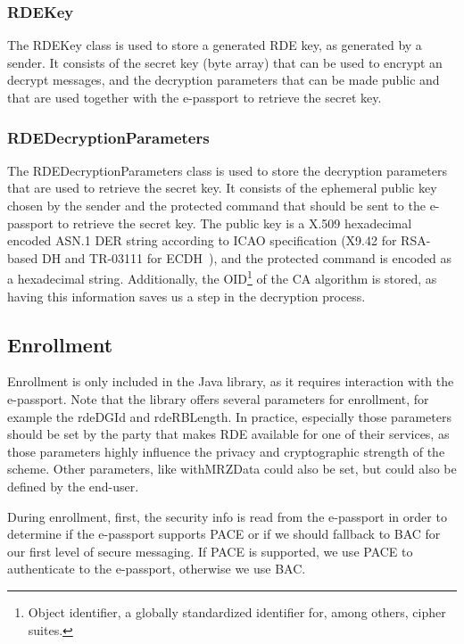 \subsubsection{\textsf{RDEKey}}\label{subsubsec:rdekey}
The \textsf{RDEKey} class is used to store a generated RDE key, as generated by a sender.
It consists of the secret key (byte array) that can be used to encrypt an decrypt messages, and the decryption parameters that can be made public and that are used together with the e-passport to retrieve the secret key.

\subsubsection{\textsf{RDEDecryptionParameters}}\label{subsubsec:rde-decryption-parameters}
The \textsf{RDEDecryptionParameters} class is used to store the decryption parameters that are used to retrieve the secret key.
It consists of the ephemeral public key chosen by the sender and the protected command that should be sent to the e-passport to retrieve the secret key.
The public key is a X.509 hexadecimal encoded ASN.1 DER string according to ICAO specification (X9.42 for RSA-based DH and TR-03111 for ECDH~\cite{icao9303securitymechanisms}), and the protected command is encoded as a hexadecimal string.
Additionally, the OID\footnote{Object identifier, a globally standardized identifier for, among others, cipher suites.} of the CA algorithm is stored, as having this information saves us a step in the decryption process.

\subsection{Enrollment}\label{subsec:enrollment}
Enrollment is only included in the Java library, as it requires interaction with the e-passport.
Note that the library offers several parameters for enrollment, for example the \textsf{rdeDGId} and \textsf{rdeRBLength}.
In practice, especially those parameters should be set by the party that makes RDE available for one of their services, as those parameters highly influence the privacy and cryptographic strength of the scheme.
Other parameters, like \textsf{withMRZData} could also be set, but could also be defined by the end-user.

During enrollment, first, the security info is read from the e-passport in order to determine if the e-passport supports PACE or if we should fallback to BAC for our first level of secure messaging.
If PACE is supported, we use PACE to authenticate to the e-passport, otherwise we use BAC.

